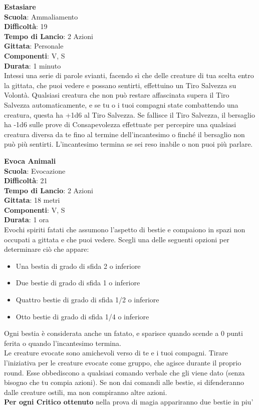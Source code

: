 \begin{multicols}{2}
\medskip\textbf{Estasiare}\\
\textbf{Scuola}: Ammaliamento\\
\textbf{Difficoltà}: 19\\
\textbf{Tempo di Lancio}: 2 Azioni\\
\textbf{Gittata}: Personale\\
\textbf{Componenti}: V, S\\
\textbf{Durata}: 1 minuto\\
Intessi una serie di parole svianti, facendo sì che delle creature di tua scelta entro la gittata, che puoi vedere e possano sentirti, effettuino un Tiro Salvezza su Volontà. Qualsiasi creatura che non può restare affascinata supera il Tiro Salvezza automaticamente, e se tu o i tuoi compagni state combattendo una creatura, questa ha +1d6 al Tiro Salvezza. Se fallisce il Tiro Salvezza, il bersaglio ha -1d6 sulle prove di Consapevolezza effettuate per percepire una qualsiasi creatura diversa da te fino al termine dell'incantesimo o finché il bersaglio non può più sentirti.
L'incantesimo termina se sei reso inabile o non puoi più parlare.

\medskip\textbf{Evoca Animali}\\
\textbf{Scuola}: Evocazione\\
\textbf{Difficoltà}: 21\\
\textbf{Tempo di Lancio}: 2 Azioni\\
\textbf{Gittata}: 18 metri\\
\textbf{Componenti}: V, S\\
\textbf{Durata}: 1 ora\\
Evochi spiriti fatati che assumono l'aspetto di bestie e compaiono in spazi non occupati a gittata e che puoi vedere. Scegli una delle seguenti opzioni per determinare ciò che appare:
\begin{itemize}
\item
Una bestia di grado di sfida 2 o inferiore
\item
Due bestie di grado di sfida 1 o inferiore
\item
Quattro bestie di grado di sfida 1/2 o inferiore
\item
Otto bestie di grado di sfida 1/4 o inferiore
\end{itemize}
\medskip
Ogni bestia è considerata anche un fatato, e sparisce quando scende a 0 punti ferita o quando l'incantesimo termina. \\
Le creature evocate sono amichevoli verso di te e i tuoi compagni. Tirare l'iniziativa per le creature evocate come gruppo, che agisce durante il proprio round. Esse obbediscono a qualsiasi comando verbale che gli viene dato (senza bisogno che tu compia azioni). Se non dai comandi alle bestie, si difenderanno dalle creature ostili, ma non compiranno altre azioni.\\
\textbf{Per ogni Critico ottenuto} nella prova di magia appariranno due bestie in piu'


\end{multicols}
